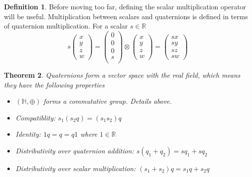 \documentclass{amsart}
\newtheorem{theorem}{Theorem}[section]
\theoremstyle{definition}
\newtheorem{definition}[theorem]{Definition}
\theoremstyle{remark}
\numberwithin{equation}{section}
\begin{document}
\begin{definition}
  Before moving too far, defining the scalar multiplication operator will be useful. Multiplication between scalars and quaternions is defined in terms of quaternion multiplication. For a scalar $s\in\mathbb{R}$
  \begin{equation}
    s
    \begin{pmatrix}
      x \\
      y \\
      z \\
      w
    \end{pmatrix} =
    \begin{pmatrix}
      0 \\
      0 \\
      0 \\
      s \\
    \end{pmatrix}
    \otimes 
    \begin{pmatrix}
      x \\
      y \\
      z \\
      w
    \end{pmatrix} = 
    \begin{pmatrix}
      sx \\
      sy \\
      sz \\
      sw
    \end{pmatrix}
  \end{equation}
\end{definition}

\begin{theorem}
  Quaternions form a vector space with the real field, which means they have the following properties 
  \begin{itemize}
  \item $(\mathbb{H}, \oplus)$ forms a commutative group. Details above.
  \item Compatiblity: $s_1(s_2q) = (s_1s_2)q$
  \item Identity: $1q = q = q1$ where $1\in\mathbb{R}$
  \item Distributivity over quaternion addition: $s(q_1+q_2) = sq_1 + sq_2$
  \item Distributivity over scalar multiplication: $(s_1+s_2) q = s_1q + s_2 q$
  \end{itemize}
\end{theorem}
\end{document}
